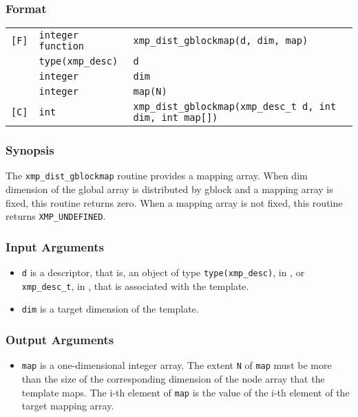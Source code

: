 \subsubsection*{Format}

\begin{tabular}{lll}

\verb![F]!& {\tt integer function}& {\tt xmp\_dist\_gblockmap(d, dim, map)}\\
          & {\tt type(xmp\_desc)} & {\tt d}\\
          & {\tt integer} & {\tt dim}\\
          & {\tt integer} & {\tt map(N)}\\

\verb![C]!&  {\tt int}& {\tt xmp\_dist\_gblockmap(xmp\_desc\_t d, int dim, int map[])}\\

\end{tabular}

\subsubsection*{Synopsis}

The {\tt xmp\_dist\_gblockmap} routine provides a mapping array. When dim dimension of the global array is distributed by gblock and a mapping array is fixed, this routine returns zero. 
  When a mapping array is not fixed, this routine returns {\tt XMP\_UNDEFINED}.

\subsubsection*{Input Arguments}
\begin{itemize}
 \item {\tt d} is a descriptor, that is, an object of type 
       {\tt type(xmp\_desc)}, in {\XMPF}, or {\tt xmp\_desc\_t},
       in {\XMPC}, that is associated with the template.
 \item {\tt dim} is a target dimension of the template.
\end{itemize}

\subsubsection*{Output Arguments}
\begin{itemize}
 \item {\tt map} is a one-dimensional integer array. The extent {\tt N} of {\tt map} must be more than the size of the corresponding dimension of the node array that the template maps.
   The i-th element of {\tt map} is the value of the i-th element of the target mapping array. 
\end{itemize}


